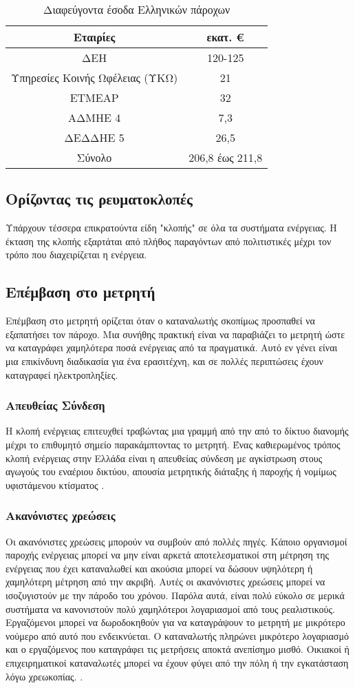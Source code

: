 \begin{table}[ht!]
\centering
\begin{tabular}{ |c||c|  }
 \hline
 Εταιρίες & εκατ. \euro\\
 \hline
 ΔΕΗ & 120-125\\
 Υπηρεσίες Κοινής Ωφέλειας (ΥΚΩ) & 21\\
 ΕΤΜΕΑΡ & 32\\
 ΑΔΜΗΕ 4 & 7,3\\
 ΔΕΔΔΗΕ 5 & 26,5\\
 \hline
 Σύνολο& 206,8 έως 211,8\\
 \hline
\end{tabular}
\caption{Διαφεύγοντα έσοδα Ελληνικών πάροχων}
\label{tab:lostearnings}
\end{table}
\subsection{Ορίζοντας τις ρευματοκλοπές}
Υπάρχουν τέσσερα επικρατούντα είδη "κλοπής" σε όλα τα συστήματα ενέργειας. Η έκταση της κλοπής εξαρτάται από πλήθος παραγόντων από πολιτιστικές μέχρι τον τρόπο που διαχειρίζεται η ενέργεια.

\subsection{Επέμβαση στο μετρητή}
Επέμβαση στο μετρητή ορίζεται όταν ο καταναλωτής σκοπίμως προσπαθεί να εξαπατήσει τον πάροχο. Μια συνήθης πρακτική είναι να παραβιάζει το μετρητή ώστε να καταγράφει χαμηλότερα ποσά ενέργειας από τα πραγματικά. Αυτό εν γένει είναι μια  επικίνδυνη διαδικασία για ένα ερασιτέχνη, και σε πολλές περιπτώσεις έχουν καταγραφεί ηλεκτροπληξίες.
\subsubsection{Απευθείας Σύνδεση}
Η κλοπή ενέργειας επιτευχθεί τραβώντας μια γραμμή από την από το δίκτυο διανομής μέχρι το επιθυμητό σημείο παρακάμπτοντας το μετρητή. Ένας καθιερωμένος τρόπος κλοπή ενέργειας στην Ελλάδα είναι η απευθείας σύνδεση με αγκίστρωση στους αγωγούς του εναέριου δικτύου, απουσία μετρητικής διάταξης ή παροχής ή νομίμως υφιστάμενου κτίσματος \cite{rae}.
\subsubsection{Ακανόνιστες χρεώσεις}
Οι ακανόνιστες χρεώσεις μπορούν να συμβούν από πολλές πηγές. Κάποιο οργανισμοί παροχής ενέργειας μπορεί να μην είναι αρκετά αποτελεσματικοί στη μέτρηση της ενέργειας που έχει καταναλωθεί και ακούσια μπορεί να δώσουν υψηλότερη ή χαμηλότερη μέτρηση από την ακριβή. Αυτές οι ακανόνιστες χρεώσεις μπορεί να ισοζυγιστούν με την πάροδο του χρόνου. Παρόλα αυτά, είναι πολύ εύκολο σε μερικά συστήματα να κανονιστούν πολύ χαμηλότεροι λογαριασμοί από τους ρεαλιστικούς. Εργαζόμενοι μπορεί να δωροδοκηθούν για να καταγράψουν το μετρητή με μικρότερο νούμερο από αυτό που ενδεικνύεται. Ο καταναλωτής πληρώνει μικρότερο λογαριασμό και ο εργαζόμενος που καταγράφει τις μετρήσεις αποκτά ανεπίσημο μισθό. Οικιακοί ή επιχειρηματικοί καταναλωτές  μπορεί να έχουν φύγει από την πόλη ή την εγκατάσταση λόγω χρεωκοπίας. .
